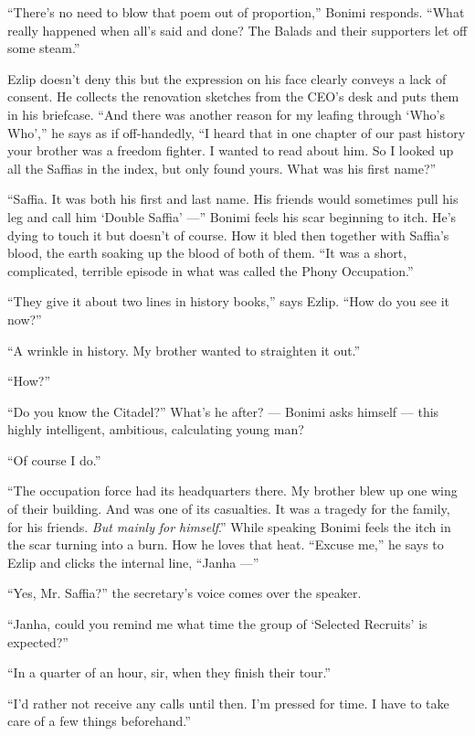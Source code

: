 \documentclass[twoside,11pt,openany]{book}
\begin{document}
``There's no need to blow that poem out of proportion,'' Bonimi responds. ``What
really happened when all's said and done? The Balads and their supporters let off some steam.''

Ezlip doesn't deny this but the expression on his face clearly conveys a lack of consent. He collects the renovation
sketches from the CEO's desk and puts them in his briefcase. ``And there was another reason for my leafing
through `Who's Who','' he says as if off-handedly, ``I heard that in one chapter of our
past history your brother was a freedom fighter. I wanted to read about him. So I looked up all the Saffias in the
index, but only found yours. What was his first name?''

``Saffia. It was both his first and last name. His friends would sometimes pull his leg and call him
`Double Saffia' ---'' Bonimi feels his scar beginning to itch. He's dying to touch it but doesn't of course.
How it bled then together with Saffia's blood, the earth soaking up the blood of both of them. ``It was a
short, complicated, terrible episode in what was called the Phony Occupation.''

``They give it about two lines in history books,'' says Ezlip. ``How do you see
it now?''

``A wrinkle in history. My brother wanted to straighten it out.''

``How?''

``Do you know the Citadel?'' What's he after? --- Bonimi asks himself --- this highly intelligent,
ambitious, calculating young man?

``Of course I do.''

``The occupation force had its headquarters there. My brother blew up one wing of their building. And was
one of its casualties. It was a tragedy for the family, for his friends. \textit{But mainly} \textit{for
himself}.''  While speaking Bonimi feels the itch in the scar turning into a burn. How he loves that
heat. ``Excuse me,'' he says to Ezlip and clicks the internal line, ``Janha ---''

``Yes, Mr. Saffia?'' the secretary's voice comes over the speaker.

``Janha, could you remind me what time the group of `Selected Recruits' is
expected?''

``In a quarter of an hour, sir, when they finish their tour.''

``I'd rather not receive any calls until then. I'm pressed for time. I have to take care of a few things
beforehand.''
\end{document}
